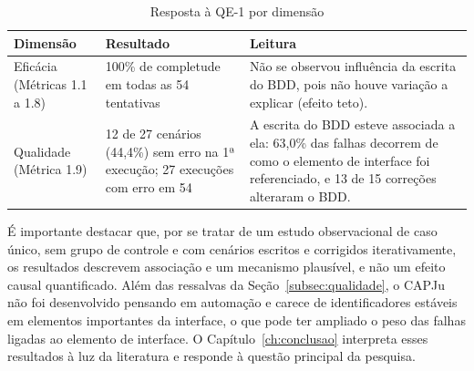 \begin{table}[htb]
\centering
\caption{Resposta à QE-1 por dimensão}
\label{tab:resposta-qe1}
\begin{tabular}{p{3.0cm}p{5.0cm}p{6.6cm}}
\hline
\textbf{Dimensão} & \textbf{Resultado} & \textbf{Leitura} \\
\hline
Eficácia (Métricas 1.1 a 1.8) & 100\% de completude em todas as 54 tentativas & Não se observou influência da escrita do BDD, pois não houve variação a explicar (efeito teto). \\
\hline
Qualidade (Métrica 1.9) & 12 de 27 cenários (44,4\%) sem erro na 1ª execução; 27 execuções com erro em 54 & A escrita do BDD esteve associada a ela: 63,0\% das falhas decorrem de como o elemento de interface foi referenciado, e 13 de 15 correções alteraram o BDD. \\
\hline
\end{tabular}
\end{table}

É importante destacar que, por se tratar de um estudo observacional de caso único, sem grupo de controle e com cenários escritos e corrigidos iterativamente, os resultados descrevem associação e um mecanismo plausível, e não um efeito causal quantificado. Além das ressalvas da Seção~\ref{subsec:qualidade}, o CAPJu não foi desenvolvido pensando em automação e carece de identificadores estáveis em elementos importantes da interface, o que pode ter ampliado o peso das falhas ligadas ao elemento de interface. O Capítulo~\ref{ch:conclusao} interpreta esses resultados à luz da literatura e responde à questão principal da pesquisa.

